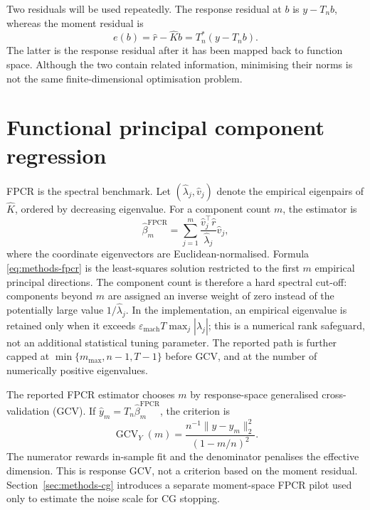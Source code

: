 Two residuals will be used repeatedly.  The response residual at $b$ is
$y-T_nb$, whereas the moment residual is
\begin{equation}
    e(b)=\widehat r-\widehat Kb
        =T_n^*(y-T_nb).
    \label{eq:methods-moment-residual}
\end{equation}
The latter is the response residual after it has been mapped back to function
space.  Although the two contain related information, minimising their norms
is not the same finite-dimensional optimisation problem.

\section{Functional principal component regression}
\label{sec:methods-fpcr}

FPCR is the spectral benchmark.  Let
$(\widehat\lambda_j,\widehat v_j)$ denote the empirical eigenpairs of
$\widehat K$, ordered by decreasing eigenvalue.  For a component count $m$,
the estimator is
\begin{equation}
    \widehat\beta_m^{\mathrm{FPCR}}
    =\sum_{j=1}^{m}
      \frac{\widehat v_j^\top\widehat r}
           {\widehat\lambda_j}\widehat v_j,
    \label{eq:methods-fpcr}
\end{equation}
where the coordinate eigenvectors are Euclidean-normalised.  Formula
\eqref{eq:methods-fpcr} is the least-squares solution restricted to the first
$m$ empirical principal directions.  The component count is therefore a
hard spectral cut-off: components beyond $m$ are assigned an inverse weight
of zero instead of the potentially large value
$1/\widehat\lambda_j$.
In the implementation, an empirical eigenvalue is retained only when it
exceeds
$\varepsilon_{\mathrm{mach}}T\max_j|\widehat\lambda_j|$; this is a numerical
rank safeguard, not an additional statistical tuning parameter.
The reported path is further capped at
$\min\{m_{\max},n-1,T-1\}$ before GCV, and at the number of numerically
positive eigenvalues.

The reported FPCR estimator chooses $m$ by response-space generalised
cross-validation (GCV).  If
$\widehat y_m=T_n\widehat\beta_m^{\mathrm{FPCR}}$, the criterion is
\begin{equation}
    \operatorname{GCV}_{Y}(m)
    =\frac{n^{-1}\|y-\widehat y_m\|_2^2}
           {(1-m/n)^2}.
    \label{eq:methods-response-gcv}
\end{equation}
The numerator rewards in-sample fit and the denominator penalises the
effective dimension.  This is response GCV, not a criterion based on the
moment residual.  Section~\ref{sec:methods-cg} introduces a separate
moment-space FPCR pilot used only to estimate the noise scale for CG stopping.


